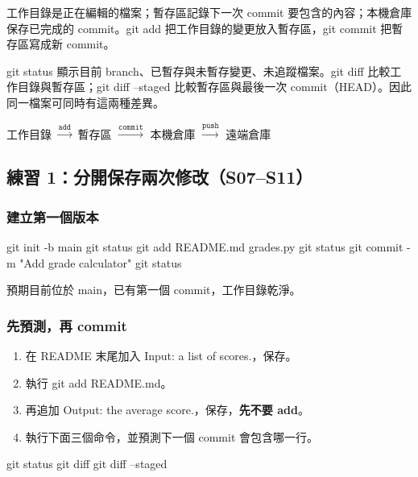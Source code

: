 \documentclass[11pt,a4paper]{article}
\DeclareRobustCommand{\code}[1]{{\small\ttfamily #1}}
\begin{document}
工作目錄是正在編輯的檔案；暫存區記錄下一次 commit 要包含的內容；本機倉庫保存已完成的 commit。\code{git add} 把工作目錄的變更放入暫存區，\code{git commit} 把暫存區寫成新 commit。

\code{git status} 顯示目前 branch、已暫存與未暫存變更、未追蹤檔案。\code{git diff} 比較工作目錄與暫存區；\code{git diff --staged} 比較暫存區與最後一次 commit（\code{HEAD}）。因此同一檔案可同時有這兩種差異。

\begin{center}
工作目錄 $\xrightarrow{\texttt{add}}$ 暫存區 $\xrightarrow{\texttt{commit}}$ 本機倉庫 $\xrightarrow{\texttt{push}}$ 遠端倉庫
\end{center}

\subsection{練習 1：分開保存兩次修改（S07–S11）}
\label{exercise:staging}

\subsubsection{建立第一個版本}

\begin{Code}
git init -b main
git status
git add README.md grades.py
git status
git commit -m "Add grade calculator"
git status
\end{Code}

預期目前位於 \code{main}，已有第一個 commit，工作目錄乾淨。

\subsubsection{先預測，再 commit}

\begin{enumerate}
    \item 在 README 末尾加入 \code{Input: a list of scores.}，保存。
    \item 執行 \code{git add README.md}。
    \item 再追加 \code{Output: the average score.}，保存，\textbf{先不要 \code{add}}。
    \item 執行下面三個命令，並預測下一個 commit 會包含哪一行。
\end{enumerate}

\begin{Code}
git status
git diff
git diff --staged
\end{Code}
\end{document}
